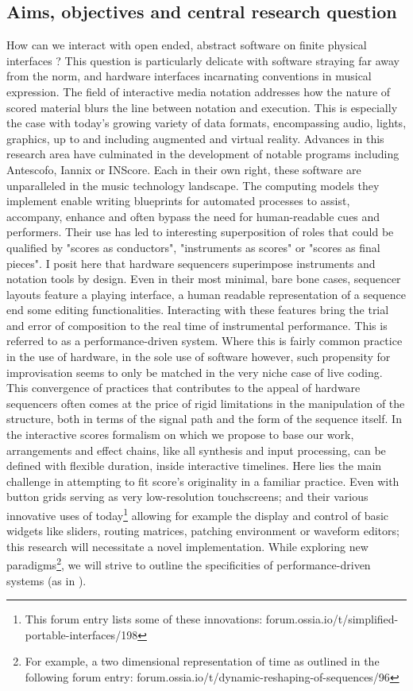 \documentclass[journal,onecolumn]{IEEEtran}
\begin{document}
\subsection{Aims, objectives and central research question}
How can we interact with open ended, abstract software on finite physical interfaces ? This question is particularly delicate with software straying far away from the norm, and hardware interfaces incarnating conventions in musical expression.
The field of interactive media notation addresses how the nature of scored material blurs the line between notation and execution. This is especially the case with today's growing variety of data formats, encompassing audio, lights, graphics, up to and including augmented and virtual reality. 
Advances in this research area have culminated in the development of notable programs including Antescofo\cite{ircam:antescofo}, Iannix\cite{buzzing:iannix} or INScore\cite{grame:inscore}.
Each in their own right, these software are unparalleled in the music technology landscape. The computing models they implement enable writing blueprints for automated processes to assist, accompany, enhance and often bypass the need for human-readable cues and performers. Their use has led to interesting superposition of roles that could be qualified by "scores as conductors", "instruments as scores" or "scores as final pieces". I posit here that hardware sequencers superimpose instruments and notation tools by design. Even in their most minimal, bare bone cases, sequencer layouts feature a playing interface, a human readable representation of a sequence end some editing functionalities.
Interacting with these features bring the trial and error of composition to the real time of instrumental performance. This is referred to as a performance-driven system\cite{nash:liveness}. Where this is fairly common practice in the use of hardware, in the sole use of software however, such propensity for improvisation seems to only be matched in the very niche case of live coding\cite{blackwell:livecoding}.
This convergence of practices that contributes to the appeal of hardware sequencers often comes at the price of rigid limitations in the manipulation of the structure, both in terms of the signal path and the form of the sequence itself.
In the interactive scores formalism on which we propose to base our work, arrangements and effect chains, like all synthesis and input processing, can be defined with flexible duration, inside interactive timelines. Here lies the main challenge in attempting to fit score's originality in a familiar practice. Even with button grids serving as very low-resolution touchscreens;
and their various innovative uses of today\footnote{This forum entry lists some of these innovations: forum.ossia.io/t/simplified-portable-interfaces/198} allowing for example the display and control of basic widgets like sliders, routing matrices, patching environment or waveform editors; this research will necessitate a novel implementation. While exploring new paradigms\footnote{For example, a two dimensional representation of time as outlined in the following forum entry: forum.ossia.io/t/dynamic-reshaping-of-sequences/96}, we will strive to outline the specificities of performance-driven systems (as in \cite{nash:liveness}).
\end{document}
